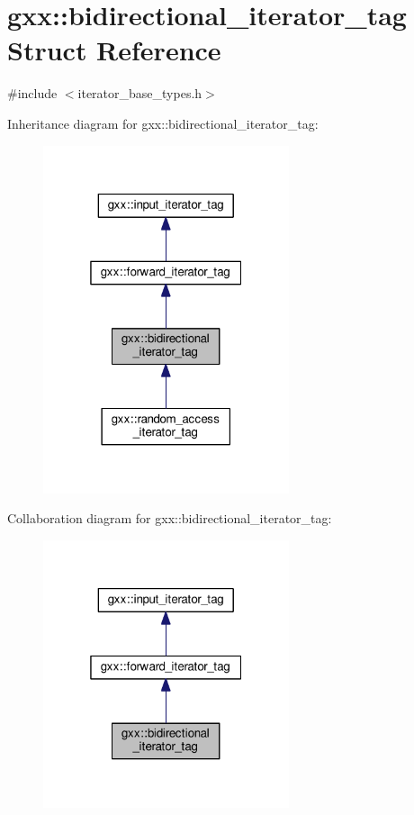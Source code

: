 \hypertarget{structgxx_1_1bidirectional__iterator__tag}{}\section{gxx\+:\+:bidirectional\+\_\+iterator\+\_\+tag Struct Reference}
\label{structgxx_1_1bidirectional__iterator__tag}


{\ttfamily \#include $<$iterator\+\_\+base\+\_\+types.\+h$>$}



Inheritance diagram for gxx\+:\+:bidirectional\+\_\+iterator\+\_\+tag\+:
\nopagebreak
\begin{figure}[H]
\begin{center}
\leavevmode
\includegraphics[width=205pt]{structgxx_1_1bidirectional__iterator__tag__inherit__graph}
\end{center}
\end{figure}


Collaboration diagram for gxx\+:\+:bidirectional\+\_\+iterator\+\_\+tag\+:
\nopagebreak
\begin{figure}[H]
\begin{center}
\leavevmode
\includegraphics[width=205pt]{structgxx_1_1bidirectional__iterator__tag__coll__graph}
\end{center}
\end{figure}


